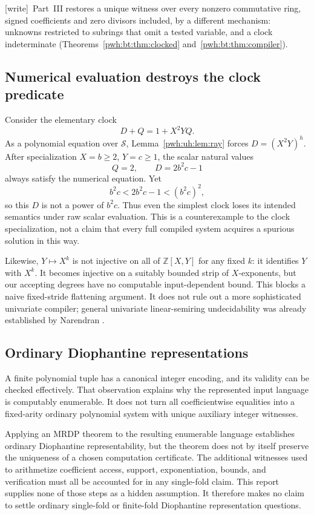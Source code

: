 \documentclass[11pt,letterpaper]{article}
\numberwithin{equation}{section}
\theoremstyle{definition}
\newcommand{\Z}{\mathbb Z}
\newcommand{\Sring}{\mathcal S}
\newcommand{\wtag}{\textup{[write]}}
\begin{document}
\wtag\ Part~III restores a unique witness over every nonzero commutative
ring, signed coefficients and zero divisors included, by a different
mechanism: unknowns restricted to subrings that omit a tested variable, and
a clock indeterminate (Theorems~\ref{pwh:bt:thm:clocked}
and~\ref{pwh:bt:thm:compiler}).

\subsection{Numerical evaluation destroys the clock predicate}

Consider the elementary clock
\[
 D+Q=1+X^2YQ.
\]
As a polynomial equation over $\Sring$, Lemma~\ref{pwh:uh:lem:ray} forces
$D=(X^2Y)^h$. After specialization $X=b\ge2$, $Y=c\ge1$, the scalar
natural values
\[
 Q=2,\qquad D=2b^2c-1
\]
always satisfy the numerical equation. Yet
\[
 b^2c<2b^2c-1<(b^2c)^2,
\]
so this $D$ is not a power of $b^2c$. Thus even the simplest clock loses
its intended semantics under raw scalar evaluation. This is a
counterexample to the clock specialization, not a claim that every full
compiled system acquires a spurious solution in this way.

Likewise, $Y\mapsto X^k$ is not injective on all of $\Z[X,Y]$ for any
fixed $k$: it identifies $Y$ with $X^k$. It becomes injective on a
suitably bounded strip of $X$-exponents, but our accepting degrees have
no computable input-dependent bound. This blocks a naive fixed-stride
flattening argument. It does not rule out a more sophisticated
univariate compiler; general univariate linear-semiring undecidability
was already established by Narendran \cite{uh:Narendran}.

\subsection{Ordinary Diophantine representations}

A finite polynomial tuple has a canonical integer encoding, and its
validity can be checked effectively. That observation explains why the
represented input language is computably enumerable. It does not turn
all coefficientwise equalities into a fixed-arity ordinary polynomial
system with unique auxiliary integer witnesses.

Applying an MRDP theorem to the resulting enumerable language establishes
ordinary Diophantine representability, but the theorem does not by itself
preserve the uniqueness of a chosen computation certificate. The
additional witnesses used to arithmetize coefficient access, support,
exponentiation, bounds, and verification must all be accounted for in any
single-fold claim. This report supplies none of those steps as a hidden
assumption. It therefore makes no claim to settle ordinary single-fold
or finite-fold Diophantine representation questions.
\end{document}
